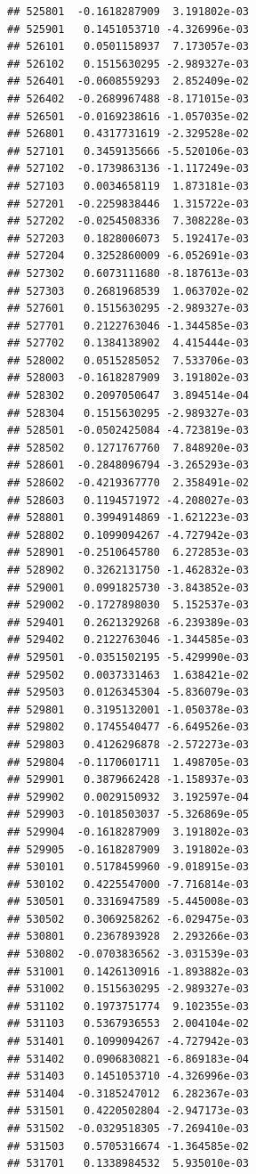 \documentclass[ignorenonframetext,]{beamer}
\begin{document}
\begin{frame}[fragile]
\begin{verbatim}
## 525801  -0.1618287909  3.191802e-03
## 525901   0.1451053710 -4.326996e-03
## 526101   0.0501158937  7.173057e-03
## 526102   0.1515630295 -2.989327e-03
## 526401  -0.0608559293  2.852409e-02
## 526402  -0.2689967488 -8.171015e-03
## 526501  -0.0169238616 -1.057035e-02
## 526801   0.4317731619 -2.329528e-02
## 527101   0.3459135666 -5.520106e-03
## 527102  -0.1739863136 -1.117249e-03
## 527103   0.0034658119  1.873181e-03
## 527201  -0.2259838446  1.315722e-03
## 527202  -0.0254508336  7.308228e-03
## 527203   0.1828006073  5.192417e-03
## 527204   0.3252860009 -6.052691e-03
## 527302   0.6073111680 -8.187613e-03
## 527303   0.2681968539  1.063702e-02
## 527601   0.1515630295 -2.989327e-03
## 527701   0.2122763046 -1.344585e-03
## 527702   0.1384138902  4.415444e-03
## 528002   0.0515285052  7.533706e-03
## 528003  -0.1618287909  3.191802e-03
## 528302   0.2097050647  3.894514e-04
## 528304   0.1515630295 -2.989327e-03
## 528501  -0.0502425084 -4.723819e-03
## 528502   0.1271767760  7.848920e-03
## 528601  -0.2848096794 -3.265293e-03
## 528602  -0.4219367770  2.358491e-02
## 528603   0.1194571972 -4.208027e-03
## 528801   0.3994914869 -1.621223e-03
## 528802   0.1099094267 -4.727942e-03
## 528901  -0.2510645780  6.272853e-03
## 528902   0.3262131750 -1.462832e-03
## 529001   0.0991825730 -3.843852e-03
## 529002  -0.1727898030  5.152537e-03
## 529401   0.2621329268 -6.239389e-03
## 529402   0.2122763046 -1.344585e-03
## 529501  -0.0351502195 -5.429990e-03
## 529502   0.0037331463  1.638421e-02
## 529503   0.0126345304 -5.836079e-03
## 529801   0.3195132001 -1.050378e-03
## 529802   0.1745540477 -6.649526e-03
## 529803   0.4126296878 -2.572273e-03
## 529804  -0.1170601711  1.498705e-03
## 529901   0.3879662428 -1.158937e-03
## 529902   0.0029150932  3.192597e-04
## 529903  -0.1018503037 -5.326869e-05
## 529904  -0.1618287909  3.191802e-03
## 529905  -0.1618287909  3.191802e-03
## 530101   0.5178459960 -9.018915e-03
## 530102   0.4225547000 -7.716814e-03
## 530501   0.3316947589 -5.445008e-03
## 530502   0.3069258262 -6.029475e-03
## 530801   0.2367893928  2.293266e-03
## 530802  -0.0703836562 -3.031539e-03
## 531001   0.1426130916 -1.893882e-03
## 531002   0.1515630295 -2.989327e-03
## 531102   0.1973751774  9.102355e-03
## 531103   0.5367936553  2.004104e-02
## 531401   0.1099094267 -4.727942e-03
## 531402   0.0906830821 -6.869183e-04
## 531403   0.1451053710 -4.326996e-03
## 531404  -0.3185247012  6.282367e-03
## 531501   0.4220502804 -2.947173e-03
## 531502  -0.0329518305 -7.269410e-03
## 531503   0.5705316674 -1.364585e-02
## 531701   0.1338984532  5.935010e-03

\end{verbatim}
\end{frame}
\end{document}
